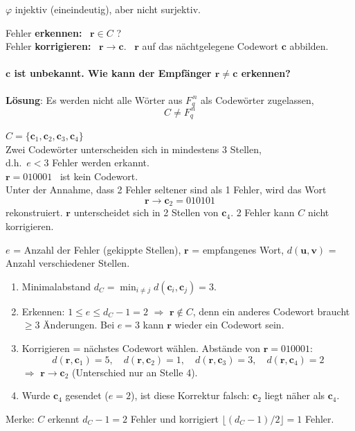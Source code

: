 $\varphi$ injektiv (eineindeutig), aber nicht surjektiv.

Fehler \textbf{erkennen:} \ $\mathbf{r} \in C$ ?\\
Fehler \textbf{korrigieren:} \ $\mathbf{r} \to \mathbf{c}$. \ $\mathbf{r}$ auf das nächtgelegene Codewort $\mathbf{c}$ abbilden.

\paragraph{$\mathbf{c}$ ist unbekannt. Wie kann der Empfänger $\mathbf{r} \neq \mathbf{c}$ erkennen?}
\textbf{Lösung}: Es werden nicht alle Wörter aus $F_q^{\,n}$ als Codewörter zugelassen,
\[ C \neq F_q^{\,n} \]

\begin{beispiel}
$C = \{\mathbf{c}_1, \mathbf{c}_2, \mathbf{c}_3, \mathbf{c}_4\}$\\
Zwei Codewörter unterscheiden sich in mindestens 3 Stellen,\\
d.h.\ $e < 3$ Fehler werden erkannt.\\
$\mathbf{r} = 010001$ \ ist kein Codewort.\\
Unter der Annahme, dass 2 Fehler seltener sind als 1 Fehler, wird das Wort
\[ \mathbf{r} \to \mathbf{c}_2 = 010101 \]
rekonstruiert.
$\mathbf{r}$ unterscheidet sich in 2 Stellen von $\mathbf{c}_4$. 2 Fehler kann $C$ nicht korrigieren.
\end{beispiel}

\begin{bemerkung}
$e$ = Anzahl der Fehler (gekippte Stellen), $\mathbf{r}$ = empfangenes Wort, $d(\mathbf{u}, \mathbf{v})$ = Anzahl verschiedener Stellen.
\begin{enumerate}
\item Minimalabstand $d_C = \min_{i \neq j} d(\mathbf{c}_i, \mathbf{c}_j) = 3$.
\item Erkennen: $1 \le e \le d_C - 1 = 2$ $\Rightarrow$ $\mathbf{r} \notin C$, denn ein anderes Codewort braucht $\ge 3$ Änderungen.
      Bei $e = 3$ kann $\mathbf{r}$ wieder ein Codewort sein.
\item Korrigieren = nächstes Codewort wählen. Abstände von $\mathbf{r} = 010001$:
\[
d(\mathbf{r}, \mathbf{c}_1) = 5, \quad d(\mathbf{r}, \mathbf{c}_2) = 1, \quad d(\mathbf{r}, \mathbf{c}_3) = 3, \quad d(\mathbf{r}, \mathbf{c}_4) = 2
\]
$\Rightarrow$ $\mathbf{r} \to \mathbf{c}_2$ (Unterschied nur an Stelle 4).
\item Wurde $\mathbf{c}_4$ gesendet ($e = 2$), ist diese Korrektur falsch: $\mathbf{c}_2$ liegt näher als $\mathbf{c}_4$.
\end{enumerate}
Merke: $C$ erkennt $d_C - 1 = 2$ Fehler und korrigiert $\lfloor (d_C - 1)/2 \rfloor = 1$ Fehler.
\end{bemerkung}

